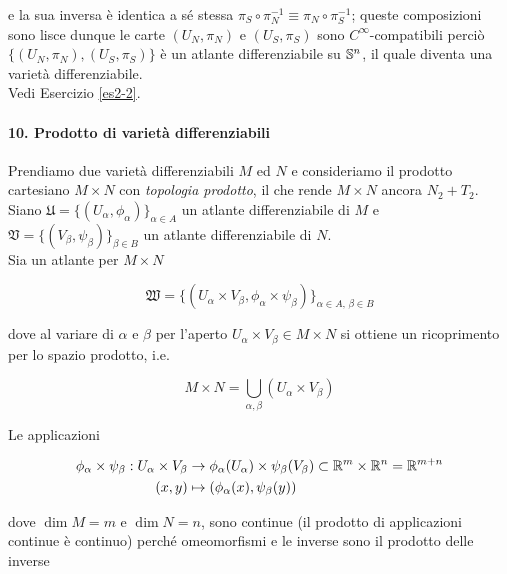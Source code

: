 e la sua inversa è identica a sé stessa $ \pi_{S} \circ \pi_{N}^{-1} \equiv \pi_{N} \circ \pi_{S}^{-1} $; queste composizioni sono lisce dunque le carte $ (U_{N},\pi_{N}) $ e $ (U_{S},\pi_{S}) $ sono $ C^{\infty} $-compatibili perciò $ \{(U_{N},\pi_{N}),(U_{S},\pi_{S})\} $ è un atlante differenziabile su $ \S^{n} $, il quale diventa una varietà differenziabile.\\
Vedi Esercizio \ref{es2-2}.

\paragraph{10. Prodotto di varietà differenziabili}

Prendiamo due varietà differenziabili $ M $ ed $ N $ e consideriamo il prodotto cartesiano $ M \times N $ con \textit{topologia prodotto}, il che rende $ M \times N $ ancora $ N_{2}+T_{2} $.\\
Siano $ \mathfrak{U} = \{(U_{\alpha},\phi_{\alpha})\}_{\alpha \in A} $ un atlante differenziabile di $ M $ e $ \mathfrak{V} = \{(V_{\beta},\psi_{\beta})\}_{\beta \in B} $ un atlante differenziabile di $ N $.\\
Sia un atlante per $ M \times N $

\begin{equation}
	\mathfrak{W} = \{(U_{\alpha} \times V_{\beta},\phi_{\alpha} \times \psi_{\beta})\}_{\alpha \in A, \, \beta \in B}
\end{equation}

dove al variare di $ \alpha $ e $ \beta $ per l'aperto $ U_{\alpha} \times V_{\beta} \in M \times N $ si ottiene un ricoprimento per lo spazio prodotto, i.e.

\begin{equation}
	M \times N = \bigcup_{\alpha,\beta} (U_{\alpha} \times V_{\beta})
\end{equation}

Le applicazioni

\begin{align}
	\begin{split}
		\phi_{\alpha} \times \psi_{\beta} : U_{\alpha} \times V_{\beta} &\to \phi_{\alpha}(U_{\alpha}) \times \psi_{\beta}(V_{\beta}) \subset \R^{m} \times \R^{n} = \R^{m+n}\\
		(x,y) &\mapsto (\phi_{\alpha}(x),\psi_{\beta}(y))
	\end{split}
\end{align}

dove $ \dim M = m $ e $ \dim N = n $, sono continue (il prodotto di applicazioni continue è continuo) perché omeomorfismi e le inverse sono il prodotto delle inverse

